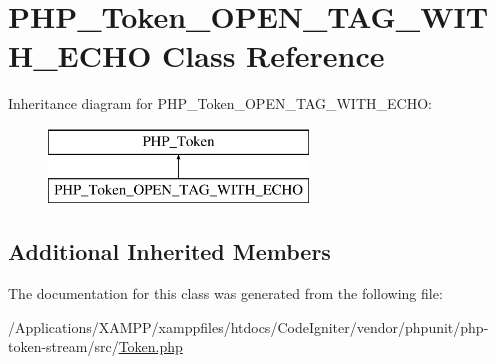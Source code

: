 \hypertarget{class_p_h_p___token___o_p_e_n___t_a_g___w_i_t_h___e_c_h_o}{}\section{P\+H\+P\+\_\+\+Token\+\_\+\+O\+P\+E\+N\+\_\+\+T\+A\+G\+\_\+\+W\+I\+T\+H\+\_\+\+E\+C\+HO Class Reference}
\label{class_p_h_p___token___o_p_e_n___t_a_g___w_i_t_h___e_c_h_o}
Inheritance diagram for P\+H\+P\+\_\+\+Token\+\_\+\+O\+P\+E\+N\+\_\+\+T\+A\+G\+\_\+\+W\+I\+T\+H\+\_\+\+E\+C\+HO\+:\begin{figure}[H]
\begin{center}
\leavevmode
\includegraphics[height=2.000000cm]{class_p_h_p___token___o_p_e_n___t_a_g___w_i_t_h___e_c_h_o}
\end{center}
\end{figure}
\subsection*{Additional Inherited Members}


The documentation for this class was generated from the following file\+:\begin{DoxyCompactItemize}
\item 
/\+Applications/\+X\+A\+M\+P\+P/xamppfiles/htdocs/\+Code\+Igniter/vendor/phpunit/php-\/token-\/stream/src/\mbox{\hyperlink{_token_8php}{Token.\+php}}\end{DoxyCompactItemize}
